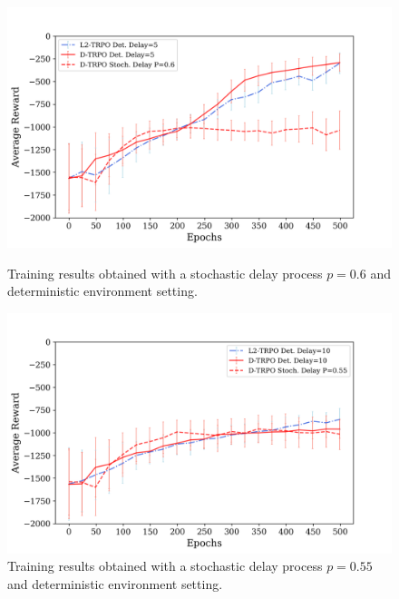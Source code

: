            \begin{figure}[hbtp]
                \centering
                \includegraphics[width=15cm, keepaspectratio]{images/results/delayp06_comparisons_1.png}
                \caption{Training results obtained with a stochastic delay process $p=0.6$ and deterministic environment setting.}
                \label{fig:results_delayp06_1}
                
                \vspace{1.5cm}
                
                \includegraphics[width=15cm, keepaspectratio]{images/results/delayp05_comparisons_1.png}
                \caption{Training results obtained with a stochastic delay process $p=0.55$ and deterministic environment setting.}
                \label{fig:results_delayp05_1}
            \end{figure}
        
        \newpage

